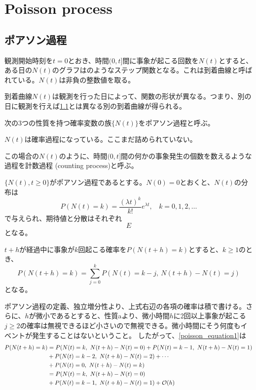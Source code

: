 \section{Poisson process}
\subsection{ポアソン過程}
観測開始時刻を$t=0$とおき、時間$(0,t]$間に事象が起こる回数を$N(t)$とすると、ある日の$N(t)$のグラフはのようなステップ関数となる。これは到着曲線と呼ばれている。$N(t)$は非負の整数値を取る。

到着曲線$N(t)$は観測を行った日によって、関数の形状が異なる。つまり、別の日に観測を行えば\ref{}とは異なる別の到着曲線が得られる。

\begin{definition}[ポアソン過程]
    次の3つの性質を持つ確率変数の族$\{N(t)\}$をポアソン過程と呼ぶ。    
\end{definition}

$N(t)$は確率過程になっている。ここまだ詰められていない。

この場合の$N(t)$のように、時間$(0,t]$間の何かの事象発生の個数を数えるような過程を計数過程 (counting process)と呼ぶ。

\begin{theorem}
    $\{N(t), t\geq0\}$がポアソン過程であるとする。$N(0)=0$とおくと、$N(t)$の分布は
    \begin{equation}
        P(N(t)=k) = \frac{(\lambda t)^k}{k!}e^{\lambda t},\ \ \ \ k=0,1,2,\ldots
    \end{equation}
    で与えられ、期待値と分散はそれぞれ
    \begin{equation}
        E
    \end{equation}
    となる。
\end{theorem}


$t+h$が経過中に事象が$k$回起こる確率を$P(N(t+h)=k)$とすると、$k\geq1$のとき、
\begin{equation}\label{poisson_equation1}
    P(N(t+h)=k) 
    = \sum_{j=0}^{k}P(N(t)=k-j,\ N(t+h)-N(t)=j)
\end{equation}
となる。

ポアソン過程の定義、独立増分性より、上式右辺の各項の確率は積で書ける。さらに、$h$が微小であるとすると、性質aより、微小時間$h$に2回以上事象が起こる$j\geq2$の確率は無視できるほど小さいので無視できる。微小時間にそう何度もイベントが発生することはないということ。
したがって、\eqref{poisson_equation1}は
\begin{align}
    P(N(t+h)=k) 
    &= P(N(t)=k,\ N(t+h)-N(t)=0)
    + P(N(t)=k-1,\ N(t+h)-N(t)=1)\notag \\
    &+ P(N(t)=k-2,\ N(t+h)-N(t)=2)+ \cdots \notag \\
    &+ P(N(t)=0,\ N(t+h)-N(t)=k) \notag \\
    &= P(N(t)=k,\ N(t+h)-N(t)=0)\notag \\
    &+ P(N(t)=k-1,\ N(t+h)-N(t)=1) + \mathcal{O}(h)
\end{align}

